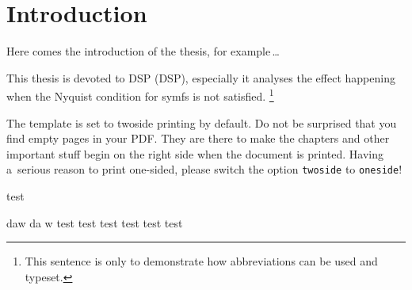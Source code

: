 \chapter*{Introduction}
{}

Here comes the introduction of the thesis, for example\,\dots

This thesis is devoted to \acs{DSP} (\acl{DSP}),
especially it analyses the effect happening when the Nyquist condition for \ac{symfs} is not satisfied.%
\footnote{This sentence is only to demonstrate how abbreviations can be used and typeset.}

The template is set to twoside printing by default.
Do not be surprised that you find empty pages in your PDF.
They are there to make the chapters and other important stuff begin on the right side when the document is printed.
Having a~serious reason to print one-sided, please switch the option \texttt{twoside} to \texttt{oneside}!

test

daw
da
w
test
test
test
test
test
test
